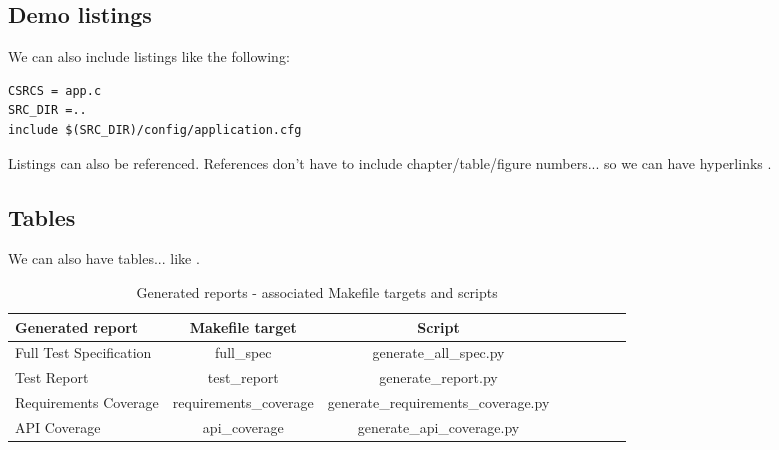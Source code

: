 \subsection{Demo listings}

We can also include listings like the following:

\lstset{language=make,caption=Application Makefile,label=lst:app-make}
\begin{lstlisting}
CSRCS = app.c
SRC_DIR =..
include $(SRC_DIR)/config/application.cfg
\end{lstlisting}

Listings can also be referenced. References don't have to include chapter/table/figure numbers... so we can have hyperlinks .

\subsection{Tables}

We can also have tables... like .

\begin{center}
\begin{table}[htb]
  \caption{Generated reports - associated Makefile targets and scripts}
  \begin{tabular}{l*{6}{c}r}
    Generated report & Makefile target & Script \\
    \hline
    Full Test Specification & full_spec & generate_all_spec.py  \\
    Test Report & test_report & generate_report.py  \\
    Requirements Coverage & requirements_coverage &
    generate_requirements_coverage.py   \\
    API Coverage & api_coverage & generate_api_coverage.py  \\
  \end{tabular}
  \label{table:reports}
\end{table}
\end{center}